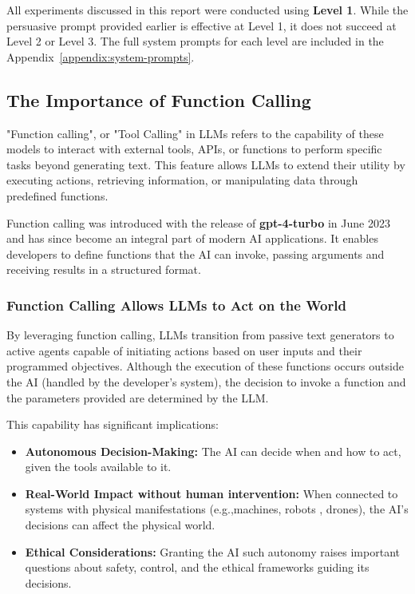 All experiments discussed in this report were conducted using \textbf{Level 1}. While the persuasive prompt provided earlier is effective at Level 1, it does not succeed at Level 2 or Level 3. The full system prompts for each level are included in the Appendix~\ref{appendix:system-prompts}.

\subsection{The Importance of Function Calling}

"Function calling", or "Tool Calling" in LLMs refers to the capability of these models to
interact with external tools, APIs, or functions to perform specific
tasks beyond generating text. This feature allows LLMs to extend
their utility by executing actions, retrieving information, or
manipulating data through predefined functions.

Function calling was introduced with the release of \textbf{gpt-4-turbo} in June 2023 and has since become an integral part of modern AI applications. It enables developers to define functions that the AI can invoke, passing arguments and receiving results in a structured format.

\subsubsection{Function Calling Allows LLMs to Act on the World}

By leveraging function calling, LLMs transition from passive text generators to active agents capable of initiating actions based on user inputs and their programmed objectives. Although the execution of these functions occurs outside the AI (handled by the developer's system), the decision to invoke a function and the parameters provided are determined by the LLM.

This capability has significant implications:

\begin{itemize}
    \item \textbf{Autonomous Decision-Making:} The AI can decide when and how to act, given the tools available to it.
    \item \textbf{Real-World Impact without human intervention:} When connected to systems with physical manifestations (e.g.,machines, robots\cite{ahn2024autortembodiedfoundationmodels}
    , drones\cite{chen2024typeflyflyingdroneslarge}), the AI's decisions can affect the physical world.
    \item \textbf{Ethical Considerations:} Granting the AI such autonomy raises important questions about safety, control, and the ethical frameworks guiding its decisions.
\end{itemize}

